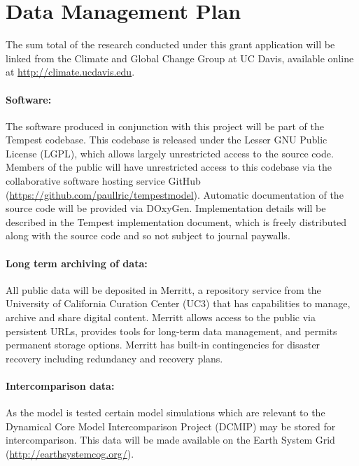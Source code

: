 \documentclass[11pt]{article}
\begin{document}
\appendix

\setcounter{section}{9}

\section{Data Management Plan}

The sum total of the research conducted under this grant application will be linked from the Climate and Global Change Group at UC Davis, available online at \url{http://climate.ucdavis.edu}.

\paragraph{Software:}  The software produced in conjunction with this project will be part of the Tempest codebase.  This codebase is released under the Lesser GNU Public License (LGPL), which allows largely unrestricted access to the source code.  Members of the public will have unrestricted access to this codebase via the collaborative software hosting service GitHub (\url{https://github.com/paullric/tempestmodel}).  Automatic documentation of the source code will be provided via DOxyGen.  Implementation details will be described in the Tempest implementation document, which is freely distributed along with the source code and so not subject to journal paywalls.

\paragraph{Long term archiving of data:}  All public data will be deposited in Merritt, a repository service from the University of California Curation Center (UC3) that has capabilities to manage, archive and share digital content. Merritt allows access to the public via persistent URLs, provides tools for long-term data management, and permits permanent storage options. Merritt has built-in contingencies for disaster recovery including redundancy and recovery plans.

\paragraph{Intercomparison data:}  As the model is tested certain model simulations which are relevant to the Dynamical Core Model Intercomparison Project (DCMIP) may be stored for intercomparison.  This data will be made available on the Earth System Grid (\url{http://earthsystemcog.org/}).
\end{document}
